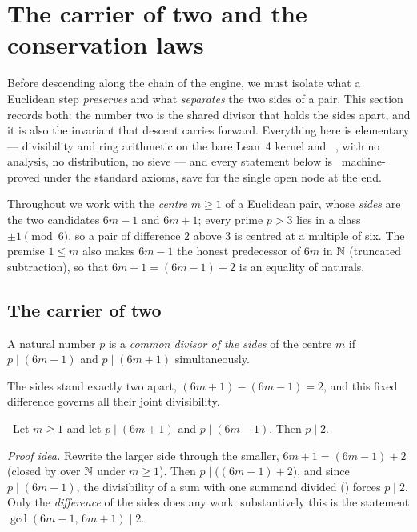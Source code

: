 \section{The carrier of two and the conservation laws}\label{sec:carrier}

Before descending along the chain of the engine, we must isolate what a Euclidean step
\emph{preserves} and what \emph{separates} the two sides of a pair. This section records both:
the number two is the shared divisor that holds the sides apart, and it is also the invariant that
descent carries forward. Everything here is elementary --- divisibility and ring arithmetic on the
bare Lean~4 kernel and ~\cite{lean4,mathlib}, with no analysis, no distribution, no
sieve --- and every statement below is \green{}~machine-proved under the standard axioms, save for
the single open node at the end.

Throughout we work with the \emph{centre} $m\ge 1$ of a Euclidean pair, whose \emph{sides} are the
two candidates $6m-1$ and $6m+1$; every prime $p>3$ lies in a class $\pm1\pmod 6$, so a pair of
difference $2$ above $3$ is centred at a multiple of six. The premise $1\le m$ also makes $6m-1$ the
honest predecessor of $6m$ in $\mathbb{N}$ (truncated subtraction), so that $6m+1=(6m-1)+2$ is an equality
of naturals.

\subsection{The carrier of two}

\begin{definition}\label{def:shared-divisor}
A natural number $p$ is a \emph{common divisor of the sides} of the centre $m$ if
$p\mid(6m-1)$ and $p\mid(6m+1)$ simultaneously.
\end{definition}

The sides stand exactly two apart, $(6m+1)-(6m-1)=2$, and this fixed difference governs all their
joint divisibility.

\begin{theorem}\label{thm:twin_sides_shared_dvd_two}
\green{}\ Let $m\ge 1$ and let $p\mid(6m+1)$ and $p\mid(6m-1)$. Then $p\mid 2$.
\end{theorem}

\emph{Proof idea.} Rewrite the larger side through the smaller, $6m+1=(6m-1)+2$ (closed by
 over $\mathbb{N}$ under $m\ge1$). Then $p\mid\bigl((6m-1)+2\bigr)$, and since $p\mid(6m-1)$,
the divisibility of a sum with one summand divided () forces $p\mid 2$.
Only the \emph{difference} of the sides does any work: substantively this is the statement
$\gcd(6m-1,\,6m+1)\mid 2$.

